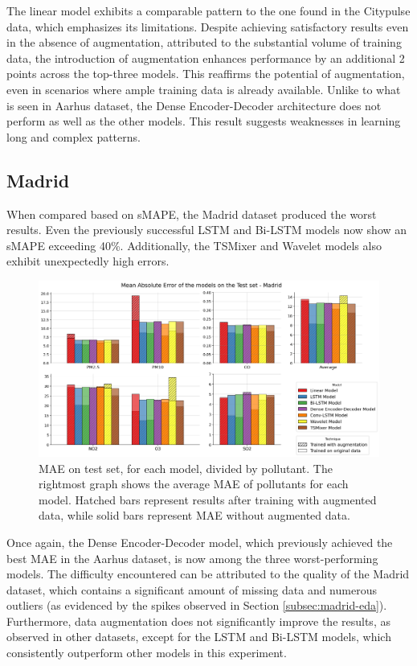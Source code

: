 The linear model exhibits a comparable pattern to the one found in the Citypulse data, which emphasizes its limitations. Despite achieving satisfactory results even in the absence of augmentation, attributed to the substantial volume of training data, the introduction of augmentation enhances performance by an additional 2 points across the top-three models. This reaffirms the potential of augmentation, even in scenarios where ample training data is already available.
Unlike to what is seen in Aarhus dataset, the Dense Encoder-Decoder architecture does not perform as well as the other models. This result suggests weaknesses in learning long and complex patterns.

\subsection{Madrid}

When compared based on sMAPE, the Madrid dataset produced the worst results. Even the previously successful LSTM and Bi-LSTM models now show an sMAPE exceeding 40\%. Additionally, the TSMixer and Wavelet models also exhibit unexpectedly high errors.

\begin{figure}[h]
    \centering
    \includegraphics[width=1\linewidth]{images/Madrid_results.png}
    \caption{MAE on test set, for each model, divided by pollutant. The rightmost graph shows the average MAE of pollutants for each model. Hatched bars represent results after training with augmented data, while solid bars represent MAE without augmented data.}
    \label{fig:madrid_results}
\end{figure}

Once again, the Dense Encoder-Decoder model, which previously achieved the best MAE in the Aarhus dataset, is now among the three worst-performing models.
The difficulty encountered can be attributed to the quality of the Madrid dataset, which contains a significant amount of missing data and numerous outliers (as evidenced by the spikes observed in Section \ref{subsec:madrid-eda}). Furthermore, data augmentation does not significantly improve the results, as observed in other datasets, except for the LSTM and Bi-LSTM models, which consistently outperform other models in this experiment.

